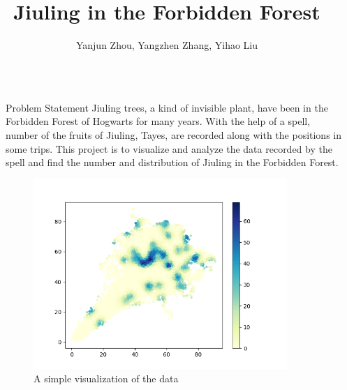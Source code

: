 \documentclass[final]{beamer}
\title{Jiuling in the Forbidden Forest \\[.1in]} %
\author{Yanjun Zhou, Yangzhen Zhang, Yihao Liu} %
\institute{Department and University Name} %
\begin{document}

\setlength{\belowcaptionskip}{2ex} %
\setlength\belowdisplayshortskip{2ex} %

\begin{frame}

\begin{columns}[t]

\begin{column}{\marginwidth}\end{column} %

\begin{column}{\colwidth} %
\begin{tcolorbox}[width=\colwidth,height=\contentheight,top=.2in]
\begin{block}{Problem Statement}
Jiuling trees, a kind of invisible plant, have been in the Forbidden Forest of Hogwarts for many years. With the help of a spell, number of the fruits of Jiuling, Tayes, are recorded along with the positions in some trips. This project is to visualize and analyze the data recorded by the spell and find the number and distribution of Jiuling in the Forbidden Forest. 
\vspace{.2in}

\begin{figure}[H]
\includegraphics[width=0.9\textwidth]{ag}
\caption{A simple visualization of the data}
\end{figure}


\end{block}
\end{tcolorbox}
\end{column}
\end{columns}
\end{frame}
\end{document}
